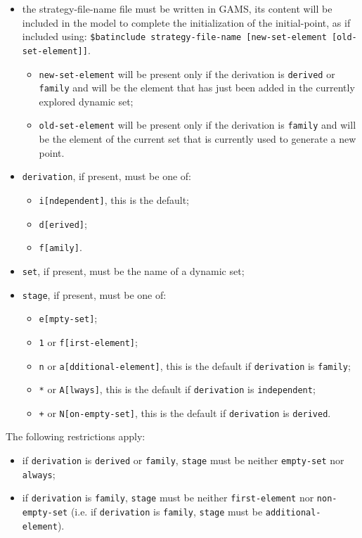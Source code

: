 \documentclass{article}
\begin{document}
\begin{itemize}
\item the strategy-file-name file must be written in GAMS, its content will be
  included in the model to complete the initialization of the initial-point, as
  if included using:
  \texttt{\$batinclude strategy-file-name [new-set-element [old-set-element]]}.
  \begin{itemize}
  \item \texttt{new-set-element} will be present only if the derivation is
    \texttt{derived} or \texttt{family} and will be the element that has just
    been added in the currently explored dynamic set;
  \item \texttt{old-set-element} will be present only if the derivation is
    \texttt{family} and will be the element of the current set that is currently
    used to generate a new point.
  \end{itemize}
\item \texttt{derivation}, if present, must be one of:
  \begin{itemize}
  \item \texttt{i[ndependent]}, this is the default;
  \item \texttt{d[erived]};
  \item \texttt{f[amily]}.
  \end{itemize}
\item \texttt{set}, if present, must be the name of a dynamic set;
\item \texttt{stage}, if present, must be one of:
  \begin{itemize}
  \item \texttt{e[mpty-set]};
  \item \texttt{1} or \texttt{f[irst-element]};
  \item \texttt{n} or \texttt{a[dditional-element]}, this is the default if
    \texttt{derivation} is \texttt{family};
  \item \texttt{*} or \texttt{A[lways]}, this is the default if
    \texttt{derivation} is \texttt{independent};
  \item \texttt{+} or \texttt{N[on-empty-set]}, this is the default if
    \texttt{derivation} is \texttt{derived}.
  \end{itemize}
\end{itemize}

The following restrictions apply:
\begin{itemize}
\item if \texttt{derivation} is \texttt{derived} or \texttt{family},
  \texttt{stage} must be neither \texttt{empty-set} nor \texttt{always};
\item if \texttt{derivation} is \texttt{family}, \texttt{stage} must be neither
  \texttt{first-element} nor \texttt{non-empty-set} (i.e. if \texttt{derivation}
  is \texttt{family}, \texttt{stage} must be \texttt{additional-element}).
\end{itemize}
\end{document}
